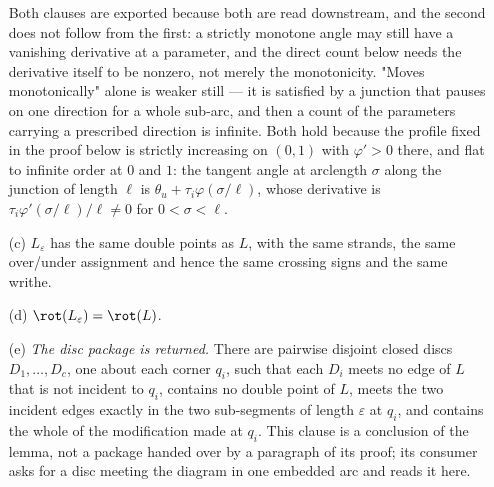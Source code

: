 \begin{lemma}[rounding]
\begin{enumerate}
Both clauses are exported because both are read downstream, and the second does
not follow from the first: a strictly monotone angle may still have a vanishing
derivative at a parameter, and the direct count below needs the derivative
itself to be nonzero, not merely the monotonicity. "Moves monotonically" alone
is weaker still --- it is
satisfied by a junction that pauses on one direction for a whole sub-arc, and
then a count of the parameters carrying a prescribed direction is infinite. Both
hold because the profile fixed in the proof below is strictly increasing on
$(0,1)$ with $\varphi'>0$ there, and flat to infinite order at $0$ and $1$: the
tangent angle at arclength $\sigma$ along the junction of length $\ell$ is
$\theta_u+\tau_i\varphi(\sigma/\ell)$, whose derivative is
$\tau_i\varphi'(\sigma/\ell)/\ell\neq0$ for $0<\sigma<\ell$.
\item[(c)] $L_\varepsilon$ has the same double points as $L$, with the same
strands, the same over/under assignment and hence the same crossing signs and
the same writhe.
\item[(d)] $\rot(L_\varepsilon)=\rot(L)$.
\item[(e)] \emph{The disc package is returned.} There are pairwise disjoint
closed discs $D_1,\dots,D_c$, one about each corner $q_i$, such that each $D_i$
meets no edge of $L$ that is not incident to $q_i$, contains no double point of
$L$, meets the two incident edges exactly in the two sub-segments of length
$\varepsilon$ at $q_i$, and contains the whole of the modification made at
$q_i$. This clause is a conclusion of the lemma, not a package handed over by a
paragraph of its proof; its consumer asks for a disc meeting the diagram in one
embedded arc and reads it here.
\end{enumerate}
\end{lemma}
